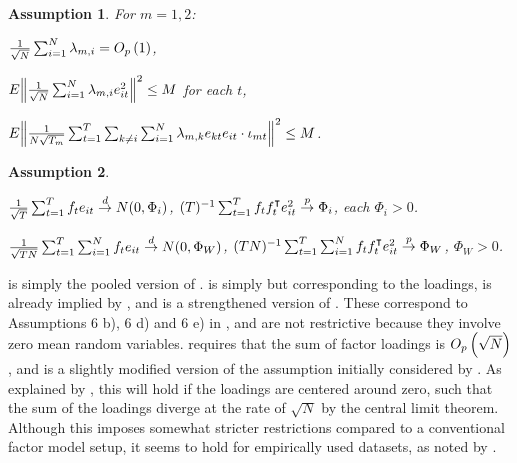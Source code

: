 \documentclass[12pt]{article}
\newtheorem{assump}{Assumption}
\newcommand*{\tran}{\intercal}
\theoremstyle{plain}
\numberwithin{equation}{section}
\begin{document}
\begin{assump}
\label{ass:16:sum_loadings}
For $m = 1, 2$:
\begin{assumpenum}
\item \label{ass:16:sum_loadings:1}
$\frac{1}{\sqrt{N}} \sum_{i = 1}^{N} \lambda_{m, i} = O_p \left( 1 \right)$,
\item \label{ass:16:sum_loadings:2}
$E \norm{\frac{1}{\sqrt{N}} \sum_{i = 1}^{N} \lambda_{m, i} e_{it}^2}^2 \leq M$ for each $t$,
\item \label{ass:16:sum_loadings:3}
$E\norm{\frac{1}{N \sqrt{T_m}} \sum_{t = 1}^{T} \sum_{k \neq i} \sum_{i = 1}^{N} \lambda_{m, k} e_{kt} e_{it} \cdot \iota_{mt}}^2 \leq M$.
\end{assumpenum}
\end{assump}
\begin{assump}
\label{ass:17:clt}
\begin{assumpenum}
\item \label{ass:17:clt:1} 
$\frac{1}{\sqrt{T}} \sum_{t = 1}^{T} f_t e_{it} \overset{d}{\to} N(0, \Phi_{i})$, $(T)^{-1} \sumT f_t f_t^\tran e_{it}^2 \convp \Phi_{i}$, each $\Phi_{i} > 0$.
\item \label{ass:17:clt:2}
$\frac{1}{\sqrt{TN}} \sum_{t = 1}^{T} \sum_{i = 1}^{N} f_t e_{it} \overset{d}{\to} N(0, \Phi_W)$, $(TN)^{-1} \sumT \sumN f_t f_t^\tran e_{it}^2 \convp \Phi_W$, $\Phi_W > 0$.
\end{assumpenum}
\end{assump}
 is simply the pooled version of .  is simply  but corresponding to the loadings,  is already implied by  , and  is a strengthened version of . These correspond to Assumptions 6 b), 6 d) and 6 e) in \textcite{han_tests_2015-1}, and are not restrictive because they involve zero mean random variables.  requires that the sum of factor loadings is $O_p \left( \sqrt{N} \right)$, and is a slightly modified version of the assumption initially considered by \textcite{han_tests_2015-1}. As explained by \textcite{han_tests_2015-1}, this will hold if the loadings are centered around zero, such that the sum of the loadings diverge at the rate of $\sqrt{N}$ by the central limit theorem. Although this imposes somewhat stricter restrictions compared to a conventional factor model setup, it seems to hold for empirically used datasets, as noted by \textcite{han_tests_2015-1}.
\end{document}
